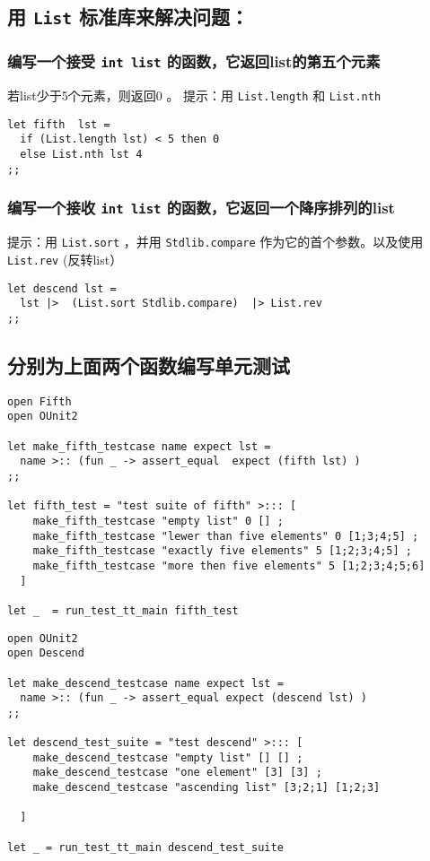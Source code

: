 \documentclass[11pt]{article}
\begin{document}
\subsection{用 \texttt{List} 标准库来解决问题：}
\label{sec:org8cbe645}

\subsubsection{编写一个接受 \texttt{int list} 的函数，它返回list的第五个元素}
\label{sec:orgae4c424}
若list少于5个元素，则返回0 。
提示：用 \texttt{List.length} 和 \texttt{List.nth}

\begin{verbatim}
let fifth  lst =
  if (List.length lst) < 5 then 0
  else List.nth lst 4
;;
\end{verbatim}

\subsubsection{编写一个接收 \texttt{int list} 的函数，它返回一个降序排列的list}
\label{sec:org16590f7}
提示：用 \texttt{List.sort} ，并用 \texttt{Stdlib.compare}  作为它的首个参数。以及使用 \texttt{List.rev} (反转list）

\begin{verbatim}
let descend lst =
  lst |>  (List.sort Stdlib.compare)  |> List.rev
;;
\end{verbatim}



\subsection{分别为上面两个函数编写单元测试}
\label{sec:org0250cab}
\begin{verbatim}
open Fifth
open OUnit2

let make_fifth_testcase name expect lst =
  name >:: (fun _ -> assert_equal  expect (fifth lst) )
;;

let fifth_test = "test suite of fifth" >::: [
    make_fifth_testcase "empty list" 0 [] ;
    make_fifth_testcase "lewer than five elements" 0 [1;3;4;5] ;
    make_fifth_testcase "exactly five elements" 5 [1;2;3;4;5] ;
    make_fifth_testcase "more then five elements" 5 [1;2;3;4;5;6] 
  ]

let _  = run_test_tt_main fifth_test 
\end{verbatim}


\begin{verbatim}
open OUnit2
open Descend

let make_descend_testcase name expect lst =
  name >:: (fun _ -> assert_equal expect (descend lst) ) 
;;

let descend_test_suite = "test descend" >::: [
    make_descend_testcase "empty list" [] [] ;
    make_descend_testcase "one element" [3] [3] ;
    make_descend_testcase "ascending list" [3;2;1] [1;2;3] 

  ]

let _ = run_test_tt_main descend_test_suite
\end{verbatim}
\end{document}
